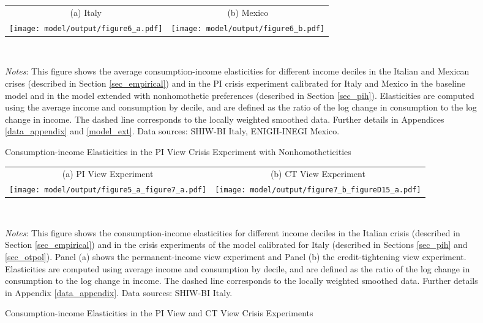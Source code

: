 \documentclass[12pt]{article}
\begin{document}
\begin{spacing}{1.5}
\begin{figure}[H]
\caption{Consumption-income Elasticities in the PI View Crisis Experiment with Nonhomotheticities}
\label{fig:cyelast_extensions_nh}
\begin{tabular}{cc}
(a) Italy & (b) Mexico \\
\texttt{[image: model/output/figure6\_a.pdf]} &
\texttt{[image: model/output/figure6\_b.pdf]}
\end{tabular} \smallskip \\
\raggedright{}\textit{\footnotesize{}Notes}{: \footnotesize{
This figure shows the average consumption-income elasticities for different income deciles in the Italian and Mexican crises (described in Section \ref{sec_empirical}) and in the PI crisis experiment calibrated for Italy and Mexico in the baseline model and in the model extended with nonhomothetic preferences (described in Section \ref{sec_pih}). Elasticities are computed using the average income and consumption by decile, and are defined as the ratio of the log change in consumption to the log change in income. The dashed line corresponds to the locally weighted smoothed data. Further details in Appendices \ref{data_appendix} and \ref{model_ext}. Data sources: SHIW-BI Italy, ENIGH-INEGI Mexico.}}{\footnotesize\par}
\end{figure}


\begin{figure}[H]
\caption{Consumption-income Elasticities in the PI View and CT View Crisis Experiments}
\label{fig: mitshock}
\begin{tabular}{cc}
(a) PI View Experiment & (b) CT View Experiment \\
\texttt{[image: model/output/figure5\_a\_figure7\_a.pdf]} &
\texttt{[image: model/output/figure7\_b\_figureD15\_a.pdf]} \\
\end{tabular}  \smallskip \\
\raggedright{}\textit{\footnotesize{}Notes}{: \footnotesize{ This figure shows the consumption-income elasticities for different income deciles in the Italian crisis (described in Section \ref{sec_empirical}) and in the crisis experiments of the model calibrated for Italy (described in Sections \ref{sec_pih} and \ref{sec_otpol}). Panel (a) shows the permanent-income view experiment and Panel (b) the credit-tightening view experiment. Elasticities are computed using average income and consumption by decile, and are defined as the ratio of the log change in consumption to the log change in income. The dashed line corresponds to the locally weighted smoothed data. Further details in Appendix \ref{data_appendix}.
Data sources: SHIW-BI Italy.}}{\footnotesize\par}
\end{figure}


\end{spacing}
\end{document}
